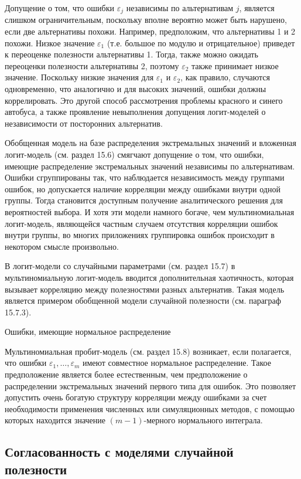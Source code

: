 Допущение о том, что ошибки ${\varepsilon }_j$ независимы по альтернативам $j$, является слишком ограничительным, поскольку вполне вероятно может быть нарушено, если две альтернативы похожи. Например, предположим, что альтернативы 1 и 2 похожи. Низкое значение ${\varepsilon }_1$ (т.е. большое по модулю и отрицательное) приведет к переоценке полезности альтернативы 1. Тогда, также можно ожидать переоценки полезности альтернативы 2, поэтому ${\varepsilon }_2$ также принимает низкое значение. Поскольку низкие значения для ${\varepsilon }_1$ и ${\varepsilon }_2$, как правило, случаются одновременно, что аналогично и для высоких значений, ошибки должны коррелировать. Это другой способ рассмотрения проблемы красного и синего автобуса, а также проявление невыполнения допущения логит-моделей о независимости от посторонних альтернатив.

Обобщенная модель на базе распределения экстремальных значений и вложенная логит-модель (см. раздел 15.6) смягчают допущение о том, что ошибки, имеющие распределение экстремальных значений независимы по альтернативам. Ошибки сгруппированы так, что наблюдается независимость между группами ошибок, но допускается наличие корреляции между ошибками внутри одной группы. Тогда становится доступным получение аналитического решения для вероятностей выбора. И хотя эти модели намного богаче, чем мультиномиальная логит-модель, являющейся частным случаем  отсутствия корреляции ошибок внутри группы, во многих приложениях группировка ошибок происходит в некотором смысле произвольно.

В логит-модели со случайными параметрами (см. раздел 15.7) в мультиномиальную логит-модель вводится дополнительная хаотичность, которая вызывает корреляцию между полезностями разных альтернатив. Такая модель является примером обобщенной модели случайной полезности (см. параграф 15.7.3).

Ошибки, имеющие нормальное распределение

Мультиномиальная пробит-модель (см. раздел 15.8) возникает, если полагается, что ошибки ${\varepsilon }_1,\dots ,{\varepsilon }_m$ имеют совместное нормальное распределение. Такое предположение является более естественным, чем предположение о распределении экстремальных значений первого типа для ошибок. Это позволяет допустить очень богатую структуру корреляции между ошибками за счет необходимости применения численных или симуляционных методов, с помощью которых находится значение $(m-1)$-мерного нормального интеграла.

\subsection{Согласованность с моделями случайной полезности}

